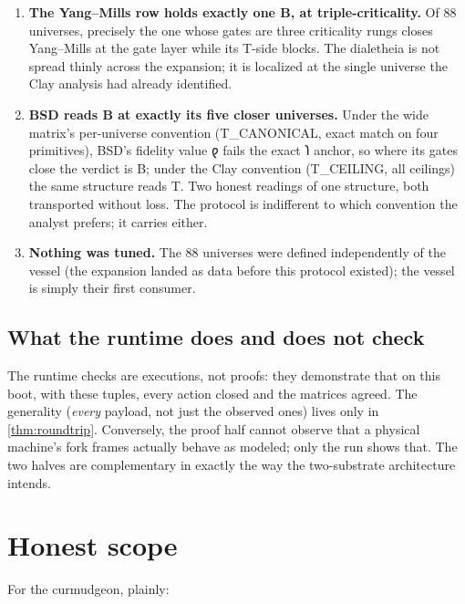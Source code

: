 \documentclass[12pt,a4paper]{article}
\newcommand{\shav}[1]{{\shavfont #1}}
\newcommand{\bT}{\textsf{T}}
\newcommand{\bB}{\textsf{B}}
\begin{document}
\begin{enumerate}
\item \textbf{The Yang--Mills row holds exactly one \bB{}, at
triple-criticality.} Of $88$ universes, precisely the one whose gates are
three criticality rungs closes Yang--Mills at the gate layer while its
T-side blocks. The dialetheia is not spread thinly across the expansion;
it is localized at the single universe the Clay analysis had already
identified.
\item \textbf{BSD reads \bB{} at exactly its five closer universes.}
Under the wide matrix's per-universe convention (T\_CANONICAL, exact
match on four primitives), BSD's fidelity value \shav{𐑞} fails the exact
\shav{𐑐} anchor, so where its gates close the verdict is \bB{}; under
the Clay convention (T\_CEILING, all ceilings) the same structure reads
\bT{}. Two honest readings of one structure, both transported without
loss. The protocol is indifferent to which convention the analyst
prefers; it carries either.
\item \textbf{Nothing was tuned.} The $88$ universes were defined
independently of the vessel (the expansion landed as data before this
protocol existed); the vessel is simply their first consumer.
\end{enumerate}

\subsection{What the runtime does and does not check}

The runtime checks are executions, not proofs: they demonstrate that on
this boot, with these tuples, every action closed and the matrices agreed.
The generality (\emph{every} payload, not just the observed ones) lives
only in \cref{thm:roundtrip}. Conversely, the proof half cannot observe
that a physical machine's fork frames actually behave as modeled; only the
run shows that. The two halves are complementary in exactly the way the
two-substrate architecture intends.

\section{Honest scope}
\label{sec:scope}

For the curmudgeon, plainly:
\end{document}
